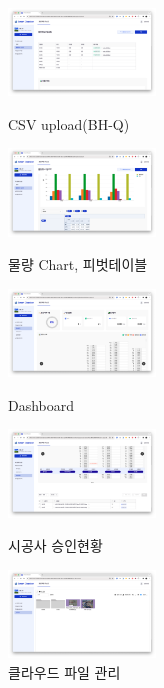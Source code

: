 \begin{itemize}[label=]
\begin{figure}[!ht]
\begin{fullwidth}
{				      \centering
				      \includegraphics[width=0.35\textwidth]{images/smart-checker-csv-upload.png}
				      \caption*{CSV upload(BH-Q)}
			      }
			      \parbox{0.35\textwidth}{
				      \centering
				      \includegraphics[width=0.35\textwidth]{images/smart-checker-csv-upload-pivot.png}
				      \caption*{물량 Chart, 피벗테이블}
			      }\qquad
			      \parbox{0.35\textwidth}{
				      \centering
				      \includegraphics[width=0.35\textwidth]{images/smart-checker-dashboard.png}
				      \caption*{Dashboard}
			      }\qquad
			      \parbox{0.35\textwidth}{
				      \centering
				      \includegraphics[width=0.35\textwidth]{images/smart-checker-approval-status.png}
				      \caption*{시공사 승인현황}
			      }\qquad
			      \parbox{0.35\textwidth}{
				      \centering
				      \includegraphics[width=0.35\textwidth]{images/smart-checker-file-browser.png}
				      \caption*{클라우드 파일 관리}
			      }
		      \end{fullwidth}
	      \end{figure}


\end{itemize}
